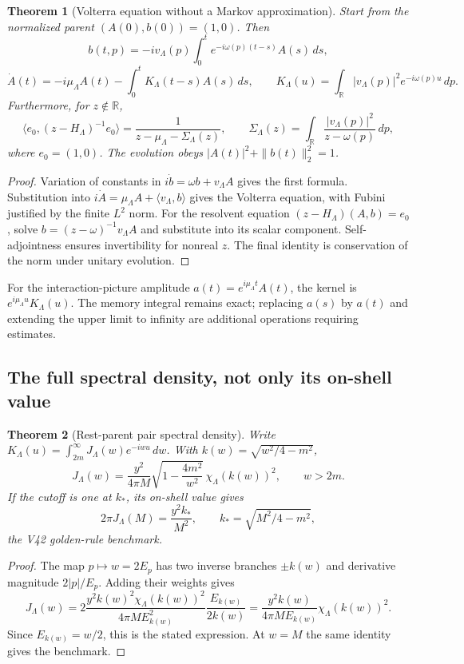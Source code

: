 \documentclass[11pt]{article}
\newtheorem{theorem}{Theorem}[section]
\theoremstyle{remark}
\begin{document}
\begin{theorem}[Volterra equation without a Markov approximation]
\label{thm:v20v46-memory}
Start from the normalized parent \((A(0),b(0))=(1,0)\).
Then
\[
 b(t,p)=-i v_\Lambda(p)\int_0^t e^{-i\omega(p)(t-s)}A(s)\,ds,
\]
\[
 \dot A(t)=-i\mu_\Lambda A(t)
 -\int_0^t K_\Lambda(t-s)A(s)\,ds,\qquad
 K_\Lambda(u)=\int_{\mathbb R}|v_\Lambda(p)|^2e^{-i\omega(p)u}\,dp.
\]
Furthermore, for \(z\notin\mathbb R\),
\[
 \langle e_0,(z-H_\Lambda)^{-1}e_0\rangle
 =\frac1{z-\mu_\Lambda-\Sigma_\Lambda(z)},\qquad
 \Sigma_\Lambda(z)=\int_{\mathbb R}
 \frac{|v_\Lambda(p)|^2}{z-\omega(p)}\,dp,
\]
where \(e_0=(1,0)\).  The evolution obeys
\(|A(t)|^2+\|b(t)\|_2^2=1\).
\end{theorem}
\begin{proof}
Variation of constants in \(i\dot b=\omega b+v_\Lambda A\)
gives the first formula.  Substitution into
\(i\dot A=\mu_\Lambda A+\langle v_\Lambda,b\rangle\) gives the
Volterra equation, with Fubini justified by the finite \(L^2\) norm.
For the resolvent equation \((z-H_\Lambda)(A,b)=e_0\), solve
\(b=(z-\omega)^{-1}v_\Lambda A\) and substitute into its scalar
component.  Self-adjointness ensures invertibility for nonreal \(z\).
The final identity is conservation of the norm under unitary evolution.
\end{proof}

For the interaction-picture amplitude \(a(t)=e^{i\mu_\Lambda t}A(t)\),
the kernel is \(e^{i\mu_\Lambda u}K_\Lambda(u)\).  The memory
integral remains exact; replacing \(a(s)\) by \(a(t)\) and extending
the upper limit to infinity are additional operations requiring
estimates.

\subsection{The full spectral density, not only its on-shell value}

\begin{theorem}[Rest-parent pair spectral density]
\label{thm:v20v46-density}
Write
\(K_\Lambda(u)=\int_{2m}^{\infty}J_\Lambda(w)e^{-iwu}\,dw\).
With \(k(w)=\sqrt{w^2/4-m^2}\),
\[
 J_\Lambda(w)=
 \frac{y^2}{4\pi M}
 \sqrt{1-\frac{4m^2}{w^2}}\,\chi_\Lambda(k(w))^2,
 \qquad w>2m.
\]
If the cutoff is one at \(k_*\), its on-shell value gives
\[
 2\pi J_\Lambda(M)=\frac{y^2 k_*}{M^2},
 \qquad k_*=\sqrt{M^2/4-m^2},
\]
the V42 golden-rule benchmark.
\end{theorem}
\begin{proof}
The map \(p\mapsto w=2E_p\) has two inverse branches
\(\pm k(w)\) and derivative magnitude \(2|p|/E_p\).
Adding their weights gives
\[
 J_\Lambda(w)=
 2\frac{y^2 k(w)^2\chi_\Lambda(k(w))^2}
 {4\pi M E_{k(w)}^2}
 \frac{E_{k(w)}}{2k(w)}
 =\frac{y^2 k(w)}{4\pi M E_{k(w)}}\chi_\Lambda(k(w))^2.
\]
Since \(E_{k(w)}=w/2\), this is the stated expression.
At \(w=M\) the same identity gives the benchmark.
\end{proof}
\end{document}
